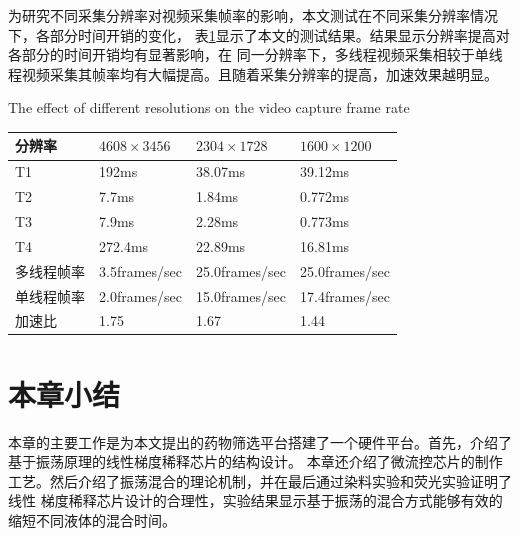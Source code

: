 	为研究不同采集分辨率对视频采集帧率的影响，本文测试在不同采集分辨率情况下，各部分时间开销的变化，
	表\ref{tab:resolutions}显示了本文的测试结果。结果显示分辨率提高对各部分的时间开销均有显著影响，在
	同一分辨率下，多线程视频采集相较于单线程视频采集其帧率均有大幅提高。且随着采集分辨率的提高，加速效果越明显。
	\begin{table}[thbp]
	\centering
    {The effect of different resolutions on the video capture frame rate}
	\label{tab:resolutions}
	\begin{tabular}{p{80pt}p{80pt}p{80pt}p{80pt}}
	\toprule
	分辨率 & $4608\times3456$ & $2304\times1728$ & $1600\times1200$ \\
	\midrule
	T1     & 192ms & 38.07ms & 39.12ms  \\
	T2     & 7.7ms & 1.84ms & 0.772ms \\
	T3		& 7.9ms & 2.28ms & 0.773ms \\
	T4 		& 272.4ms & 22.89ms & 16.81ms \\
	多线程帧率 & 3.5frames/sec & 25.0frames/sec & 25.0frames/sec \\
	单线程帧率 & 2.0frames/sec  &15.0frames/sec &  17.4frames/sec \\
	加速比		&  1.75		  &   1.67        &  1.44 \\
	\bottomrule
	\end{tabular}
	\end{table}
\section{本章小结}
	本章的主要工作是为本文提出的药物筛选平台搭建了一个硬件平台。首先，介绍了基于振荡原理的线性梯度稀释芯片的结构设计。
	本章还介绍了微流控芯片的制作工艺。然后介绍了振荡混合的理论机制，并在最后通过染料实验和荧光实验证明了线性
	梯度稀释芯片设计的合理性，实验结果显示基于振荡的混合方式能够有效的缩短不同液体的混合时间。